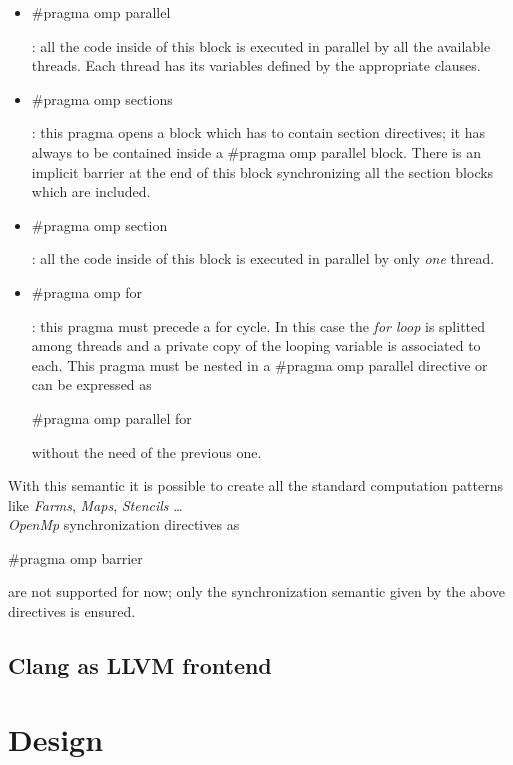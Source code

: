 \documentclass[a4paper,11pt,oneside]{book}
\begin{document}
\begin{itemize}
\item{\begin{bf}{$\#$pragma omp parallel}\end{bf} : all the code inside of this block is executed in parallel by all the available threads. Each thread has its variables defined by the appropriate clauses. }
\item{\begin{bf}{$\#$pragma omp sections}\end{bf} : this pragma opens a block which has to contain section directives; it has always to be contained inside a $\#$pragma omp parallel block. There is an implicit barrier at the end of this block synchronizing all the section blocks which are included. }
\item{\begin{bf}{$\#$pragma omp section}\end{bf} : all the code inside of this block is executed in parallel by only \emph{one} thread. }
\item{\begin{bf}{$\#$pragma omp for}\end{bf} : this pragma must precede a for cycle. In this case the \emph{for loop} is splitted among  threads and a private copy of the looping variable is associated to each. This pragma must be nested in a $\#$pragma omp parallel  directive or can be expressed as \begin{bf}{$\#$pragma omp parallel for}\end{bf} without the need of the previous one.  }
\end{itemize}
With this semantic it is possible to create all the standard computation patterns like \emph{Farms}, \emph{Maps}, \emph{Stencils} \dots \\
\emph{OpenMp} synchronization directives as \begin{bf}$\#$pragma omp barrier\end{bf} are not supported for now; only the synchronization semantic given by the above directives is ensured. 

\section{Clang as LLVM frontend}

\chapter{Design}
\end{document}
